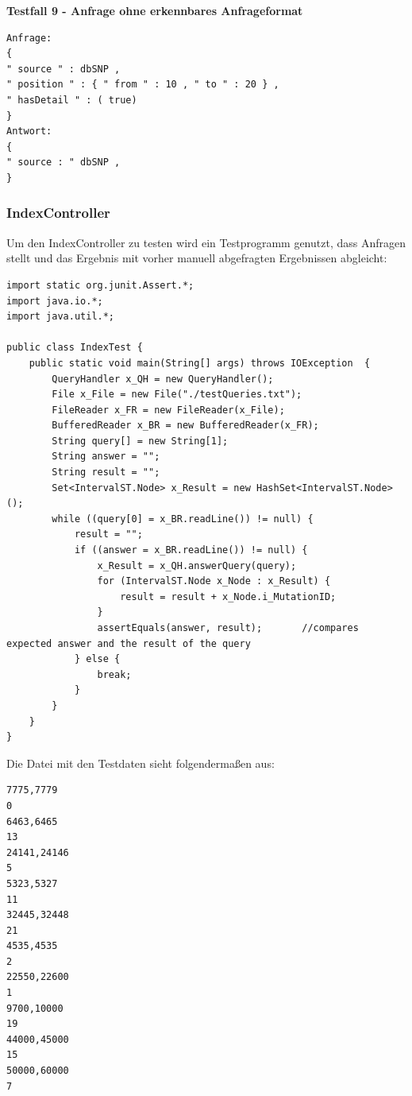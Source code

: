 \textbf{Testfall 9 - Anfrage ohne erkennbares Anfrageformat}
\begin{verbatim}
Anfrage:
{
" source " : dbSNP ,
" position " : { " from " : 10 , " to " : 20 } ,
" hasDetail " : ( true)
}
Antwort:
{
" source : " dbSNP ,
}
\end{verbatim}
\newpage
\subsubsection{IndexController}
Um den IndexController zu testen wird ein Testprogramm genutzt, dass Anfragen stellt und das Ergebnis mit vorher manuell abgefragten Ergebnissen abgleicht:
\begin{verbatim}
import static org.junit.Assert.*;
import java.io.*;
import java.util.*;

public class IndexTest {
	public static void main(String[] args) throws IOException  {
		QueryHandler x_QH = new QueryHandler();
		File x_File = new File("./testQueries.txt");
		FileReader x_FR = new FileReader(x_File);
      	BufferedReader x_BR = new BufferedReader(x_FR);
      	String query[] = new String[1];
      	String answer = "";
      	String result = "";
      	Set<IntervalST.Node> x_Result = new HashSet<IntervalST.Node>();
      	while ((query[0] = x_BR.readLine()) != null) {
      		result = "";
      		if ((answer = x_BR.readLine()) != null) {
      			x_Result = x_QH.answerQuery(query);
      			for (IntervalST.Node x_Node : x_Result) {
      				result = result + x_Node.i_MutationID;
    			}
    			assertEquals(answer, result);		//compares expected answer and the result of the query
      		} else {
      			break;
      		}
      	}
	}
}
\end{verbatim}
Die Datei mit den Testdaten sieht folgendermaßen aus:
\begin{verbatim}
7775,7779
0
6463,6465
13
24141,24146
5
5323,5327
11
32445,32448
21
4535,4535
2
22550,22600
1
9700,10000
19
44000,45000
15
50000,60000
7
\end{verbatim}
